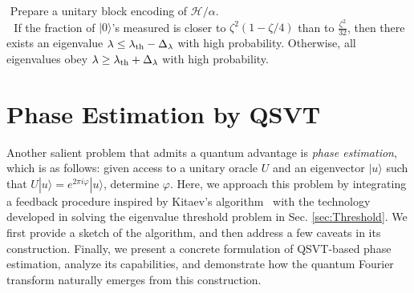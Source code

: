 \documentclass[aps,pra,showpacs,notitlepage,twocolumn,superscriptaddress,nofootinbib]{revtex4-1}
\begin{document}
    \begin{algorithm}[htpb]
     \Proc{}
     $ $ Prepare a unitary block encoding of $\mathcal{H}/\alpha$. \\
     $ $ 
     $ $ If the fraction of $|0\rangle$'s measured is closer to $\zeta^2(1-\zeta/4)$ than to $\frac{\zeta^2}{32}$, then there exists an eigenvalue $\lambda \leq \lambda_{\rm th} - \Delta_\lambda$ with high probability. Otherwise, all eigenvalues obey $\lambda \geq \lambda_{\rm th} + \Delta_{\lambda}$ with high probability.
    \caption{The Eigenvalue Threshold Problem by QSVT}
     \label{alg:EigenvalueThresholdQSVT}
    \end{algorithm}
    
    
\section{Phase Estimation by QSVT}
\label{sec:PhaseEstimation}

    Another salient problem that admits a quantum advantage is \emph{phase estimation}, which is as follows: given access to a unitary oracle $U$ and an eigenvector $|u\rangle$ such that $U|u\rangle = e^{2\pi i \varphi}|u\rangle $, determine $\varphi$. Here, we approach this problem by integrating a feedback procedure inspired by Kitaev's algorithm~\cite{kitaev2002classical, kitaev1995quantum} with the technology developed in solving the eigenvalue threshold problem in Sec. \ref{sec:Threshold}. We first provide a sketch of the algorithm, and then address a few caveats in its construction. Finally, we present a concrete formulation of QSVT-based phase estimation, analyze its capabilities, and demonstrate how the quantum Fourier transform naturally emerges from this construction. 
\end{document}
